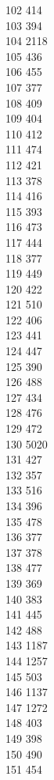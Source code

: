 { 102	414 \\
 103	394 \\
 104	2118 \\
 105	436 \\
 106	455 \\
 107	377 \\
 108	409 \\
 109	404 \\
 110	412 \\
 111	474 \\
 112	421 \\
 113	378 \\
 114	416 \\
 115	393 \\
 116	473 \\
 117	444 \\
 118	377 \\
 119	449 \\
 120	422 \\
 121	510 \\
 122	406 \\
 123	441 \\
 124	447 \\
 125	390 \\
 126	488 \\
 127	434 \\
 128	476 \\
 129	472 \\
 130	5020 \\
 131	427 \\
 132	357 \\
 133	516 \\
 134	396 \\
 135	478 \\
 136	377 \\
 137	378 \\
 138	477 \\
 139	369 \\
 140	383 \\
 141	445 \\
 142	488 \\
 143	1187 \\
 144	1257 \\
 145	503 \\
 146	1137 \\
 147	1272 \\
 148	403 \\
 149	398 \\
 150	490 \\
 151	454 \\
}
